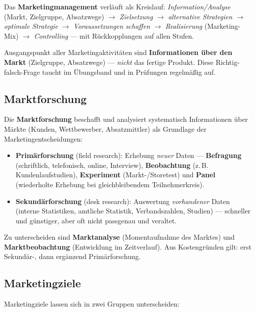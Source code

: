 \documentclass[11pt, a4paper]{article}
\begin{document}
Das \textbf{Marketingmanagement} verläuft als Kreislauf: \emph{Information/Analyse}
(Markt, Zielgruppe, Absatzwege) $\rightarrow$ \emph{Zielsetzung} $\rightarrow$
\emph{alternative Strategien} $\rightarrow$ \emph{optimale Strategie} $\rightarrow$
\emph{Voraussetzungen schaffen} $\rightarrow$ \emph{Realisierung} (Marketing-Mix)
$\rightarrow$ \emph{Controlling} --- mit Rückkopplungen auf allen Stufen.

\begin{merksatz}[title={\bfseries Prüfungsfalle}]
Ausgangspunkt aller Marketingaktivitäten sind \textbf{Informationen über den Markt}
(Zielgruppe, Absatzwege) --- \emph{nicht} das fertige Produkt. Diese
Richtig-falsch-Frage taucht im Übungsband und in Prüfungen regelmäßig auf.
\end{merksatz}

\subsection{Marktforschung}

Die \textbf{Marktforschung} beschafft und analysiert systematisch Informationen über
Märkte (Kunden, Wettbewerber, Absatzmittler) als Grundlage der Marketingentscheidungen:

\begin{itemize}
  \item \textbf{Primärforschung} (field research): Erhebung \emph{neuer} Daten ---
    \textbf{Befragung} (schriftlich, telefonisch, online, Interview),
    \textbf{Beobachtung} (z.\,B. Kundenlaufstudien), \textbf{Experiment} (Markt-/Storetest)
    und \textbf{Panel} (wiederholte Erhebung bei gleichbleibendem Teilnehmerkreis).
  \item \textbf{Sekundärforschung} (desk research): Auswertung \emph{vorhandener} Daten
    (interne Statistiken, amtliche Statistik, Verbandszahlen, Studien) --- schneller und
    günstiger, aber oft nicht passgenau und veraltet.
\end{itemize}

Zu unterscheiden sind \textbf{Marktanalyse} (Momentaufnahme des Marktes) und
\textbf{Marktbeobachtung} (Entwicklung im Zeitverlauf). Aus Kostengründen gilt: erst
Sekundär-, dann ergänzend Primärforschung.

\subsection{Marketingziele}

Marketingziele lassen sich in zwei Gruppen unterscheiden:
\end{document}
